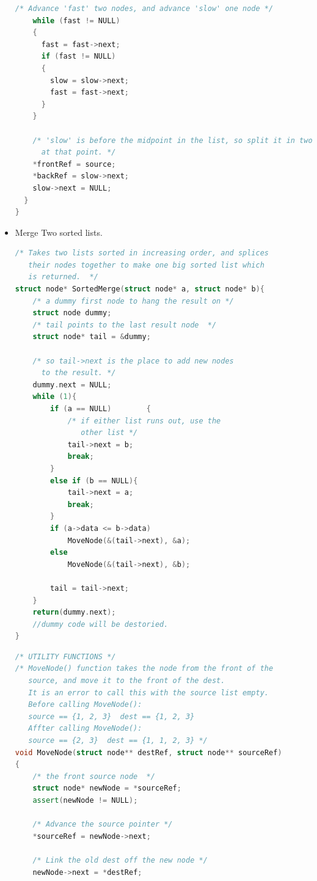 \documentclass[a4paper,12pt,twoside]{book}
\begin{document}
\begin{itemize}
\begin{lstlisting}[frame=single, language=c++]
    /* Advance 'fast' two nodes, and advance 'slow' one node */
    while (fast != NULL)
    {
      fast = fast->next;
      if (fast != NULL)
      {
        slow = slow->next;
        fast = fast->next;
      }
    }
 
    /* 'slow' is before the midpoint in the list, so split it in two
      at that point. */
    *frontRef = source;
    *backRef = slow->next;
    slow->next = NULL;
  }
}

\end{lstlisting}

\item Merge Two sorted lists.
\begin{lstlisting}[frame=single, language=c++]
/* Takes two lists sorted in increasing order, and splices
   their nodes together to make one big sorted list which
   is returned.  */
struct node* SortedMerge(struct node* a, struct node* b){
    /* a dummy first node to hang the result on */
    struct node dummy;
    /* tail points to the last result node  */
    struct node* tail = &dummy;

    /* so tail->next is the place to add new nodes
      to the result. */
    dummy.next = NULL;
    while (1){
        if (a == NULL)        {
            /* if either list runs out, use the
               other list */
            tail->next = b;
            break;
        }
        else if (b == NULL){
            tail->next = a;
            break;
        }
        if (a->data <= b->data)
            MoveNode(&(tail->next), &a);
        else
            MoveNode(&(tail->next), &b);
 
        tail = tail->next;
    }
    return(dummy.next);
    //dummy code will be destoried. 
}
 \end{lstlisting}

\begin{lstlisting}[frame=single, language=c++] 
/* UTILITY FUNCTIONS */
/* MoveNode() function takes the node from the front of the
   source, and move it to the front of the dest.
   It is an error to call this with the source list empty.
   Before calling MoveNode():
   source == {1, 2, 3}  dest == {1, 2, 3}
   Affter calling MoveNode():
   source == {2, 3}  dest == {1, 1, 2, 3} */
void MoveNode(struct node** destRef, struct node** sourceRef)
{
    /* the front source node  */
    struct node* newNode = *sourceRef;
    assert(newNode != NULL);
 
    /* Advance the source pointer */
    *sourceRef = newNode->next;
 
    /* Link the old dest off the new node */
    newNode->next = *destRef;
 

\end{lstlisting}
\end{itemize}
\end{document}
